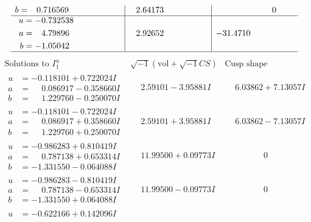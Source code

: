 \documentclass[1p]{elsarticle_modified}
\theoremstyle{definition}
\newcommand{\I}{\sqrt{-1}}
\begin{document}
$$\begin{array}{c|c|c}
\begin{aligned}
b &= \phantom{-}0.716569\phantom{ +0.000000I}\end{aligned}
 & \phantom{-}2.64173\phantom{ +0.000000I} & \phantom{-0.000000 } 0 \\ \hline\begin{aligned}
u &= -0.732538\phantom{ +0.000000I} \\
a &= \phantom{-}4.79896\phantom{ +0.000000I} \\
b &= -1.05042\phantom{ +0.000000I}\end{aligned}
 & \phantom{-}2.92652\phantom{ +0.000000I} & -31.4710\phantom{ +0.000000I}\\
 \hline 
 \end{array}$$\newpage$$\begin{array}{c|c|c}  
\text{Solutions to }I^u_{1}& \I (\text{vol} + \sqrt{-1}CS) & \text{Cusp shape}\\
 \hline 
\begin{aligned}
u &= -0.118101 + 0.722024 I \\
a &= \phantom{-}0.086917 - 0.358660 I \\
b &= \phantom{-}1.229760 - 0.250070 I\end{aligned}
 & \phantom{-}2.59101 - 3.95881 I & \phantom{-}6.03862 + 7.13057 I \\ \hline\begin{aligned}
u &= -0.118101 - 0.722024 I \\
a &= \phantom{-}0.086917 + 0.358660 I \\
b &= \phantom{-}1.229760 + 0.250070 I\end{aligned}
 & \phantom{-}2.59101 + 3.95881 I & \phantom{-}6.03862 - 7.13057 I \\ \hline\begin{aligned}
u &= -0.986283 + 0.810419 I \\
a &= \phantom{-}0.787138 + 0.653314 I \\
b &= -1.331550 - 0.064088 I\end{aligned}
 & \phantom{-}11.99500 + 0.09773 I & \phantom{-0.000000 } 0 \\ \hline\begin{aligned}
u &= -0.986283 - 0.810419 I \\
a &= \phantom{-}0.787138 - 0.653314 I \\
b &= -1.331550 + 0.064088 I\end{aligned}
 & \phantom{-}11.99500 - 0.09773 I & \phantom{-0.000000 } 0 \\ \hline\begin{aligned}
u &= -0.622166 + 0.142096 I \\

\end{aligned}
\end{array}$$
\end{document}
